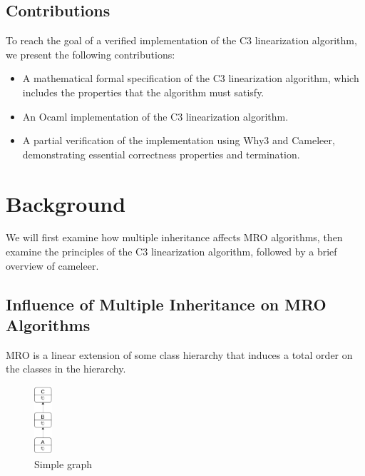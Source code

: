 \documentclass[runningheads]{llncs}
\begin{document}
\subsection{Contributions}
To reach the goal of a verified implementation of the C3 linearization algorithm, we present the following contributions:
\begin{itemize}
    \item A mathematical formal specification of the C3 linearization algorithm, which includes the properties that the algorithm must satisfy.
    \item An Ocaml implementation of the C3 linearization algorithm.
    \item A partial verification of the implementation using Why3 and Cameleer, demonstrating essential correctness properties and termination.
\end{itemize}

\section{Background}

We will first examine how multiple inheritance affects MRO algorithms, then examine the principles of the C3 linearization algorithm, followed by a brief overview of cameleer.

\subsection{Influence of Multiple Inheritance on MRO Algorithms}
MRO is a linear extension of some class hierarchy
 that induces a total order on the classes in the hierarchy\autocite{hivertControllingC3Super2024}.

\begin{figure}[htbp]
  \centering
  \includegraphics[width=0.06\textwidth]{images/SimpleDiagram.png}
  \caption{Simple graph}
  \label{fig:simpleDiagram}
\end{figure}
\end{document}
